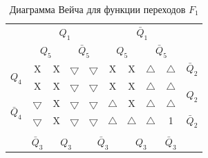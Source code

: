 \documentclass[a4paper,14pt]{article}
\begin{document}
\begin{table}[H]
	\begin{center}
		\caption{\label{tab:F1_tab} Диаграмма Вейча для функции переходов $F_1$ }
		\begin{tabular}{cccccccccc}
			& \multicolumn{4}{c}{$Q_1$} & \multicolumn{4}{c}{$\bar{Q}_1$} &  \\
			& \multicolumn{2}{c}{$Q_5$} & \multicolumn{2}{c}{$\bar{Q}_5$} & \multicolumn{2}{c}{$Q_5$} & \multicolumn{2}{c}{$\bar{Q}_5$} &  \\ \cline{2-9}
			\multicolumn{1}{c|}{\multirow{2}{*}{$Q_4$}} & \multicolumn{1}{c|}{X} & \multicolumn{1}{c|}{X} & \multicolumn{1}{c|}{$\bigtriangledown$} & \multicolumn{1}{c|}{$\bigtriangledown$} & \multicolumn{1}{c|}{X} & \multicolumn{1}{c|}{X} & \multicolumn{1}{c|}{$\bigtriangleup$} & \multicolumn{1}{c|}{$\bigtriangleup$} & $\bar{Q}_2$ \\ \cline{2-9}
			\multicolumn{1}{c|}{} & \multicolumn{1}{c|}{X} & \multicolumn{1}{c|}{X} & \multicolumn{1}{c|}{$\bigtriangledown$} & \multicolumn{1}{c|}{$\bigtriangledown$} & \multicolumn{1}{c|}{X} & \multicolumn{1}{c|}{X} & \multicolumn{1}{c|}{$\bigtriangleup$} & \multicolumn{1}{c|}{$\bigtriangleup$} & \multirow{2}{*}{$Q_2$} \\ \cline{2-9}
			\multicolumn{1}{c|}{\multirow{2}{*}{$\bar{Q}_4$}} & \multicolumn{1}{c|}{$\bigtriangledown$} & \multicolumn{1}{c|}{X} & \multicolumn{1}{c|}{$\bigtriangledown$} & \multicolumn{1}{c|}{$\bigtriangledown$} & \multicolumn{1}{c|}{$\bigtriangleup$} & \multicolumn{1}{c|}{X} & \multicolumn{1}{c|}{$\bigtriangleup$} & \multicolumn{1}{c|}{$\bigtriangleup$} &  \\ \cline{2-9}
			\multicolumn{1}{c|}{} & \multicolumn{1}{c|}{$\bigtriangledown$} & \multicolumn{1}{c|}{X} & \multicolumn{1}{c|}{$\bigtriangledown$} & \multicolumn{1}{c|}{$\bigtriangledown$} & \multicolumn{1}{c|}{$\bigtriangleup$} & \multicolumn{1}{c|}{$\bigtriangleup$} & \multicolumn{1}{c|}{$\bigtriangleup$} & \multicolumn{1}{c|}{1} & $\bar{Q}_2$ \\ \cline{2-9}
			&  & \multicolumn{2}{c}{} & \multicolumn{2}{c}{} & \multicolumn{2}{c}{} &  &  \\
			& $\bar{Q}_3$ & \multicolumn{2}{c}{$Q_3$} & \multicolumn{2}{c}{$\bar{Q}_3$} & \multicolumn{2}{c}{$Q_3$} & $\bar{Q}_3$ & 
		\end{tabular}
	\end{center}
\end{table}

\end{document}
